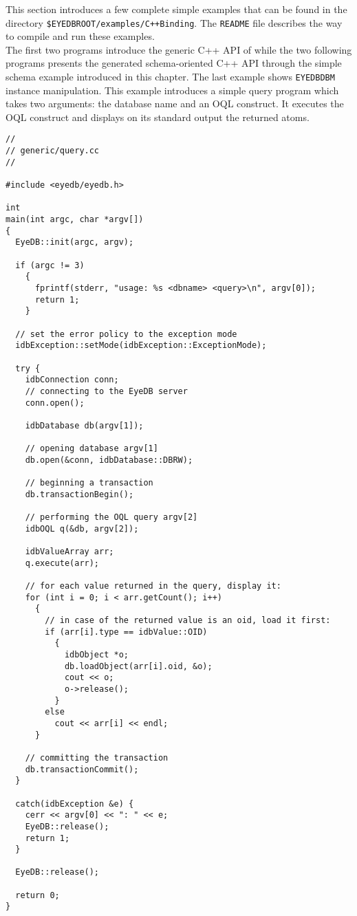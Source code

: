 This section introduces a few complete simple examples that can be found
in the directory
\texttt{\$EYEDBROOT/examples/C++Binding}.
The \texttt{README} file describes the way to compile and run these examples.
\\
The first two programs introduce the generic C++ API of
\eyedb while the two following programs presents the
generated schema-oriented C++ API through the simple schema example introduced
in this chapter. The last example shows \texttt{EYEDBDBM} instance
manipulation.
This example introduces a simple query program which takes
two arguments: the database name and an OQL construct. It executes
the OQL construct and displays on its standard output the returned
atoms.
\verbsize
\begin{verbatim}
//
// generic/query.cc
//

#include <eyedb/eyedb.h>

int
main(int argc, char *argv[])
{
  EyeDB::init(argc, argv);

  if (argc != 3)
    {
      fprintf(stderr, "usage: %
      return 1;
    }

  // set the error policy to the exception mode
  idbException::setMode(idbException::ExceptionMode);

  try {
    idbConnection conn;
    // connecting to the EyeDB server
    conn.open();

    idbDatabase db(argv[1]);

    // opening database argv[1]
    db.open(&conn, idbDatabase::DBRW);

    // beginning a transaction
    db.transactionBegin();

    // performing the OQL query argv[2]
    idbOQL q(&db, argv[2]);

    idbValueArray arr;
    q.execute(arr);

    // for each value returned in the query, display it:
    for (int i = 0; i < arr.getCount(); i++)
      {
        // in case of the returned value is an oid, load it first:
        if (arr[i].type == idbValue::OID)
          {
            idbObject *o;
            db.loadObject(arr[i].oid, &o);
            cout << o;
            o->release();
          }
        else
          cout << arr[i] << endl;
      }

    // committing the transaction
    db.transactionCommit();
  }

  catch(idbException &e) {
    cerr << argv[0] << ": " << e;
    EyeDB::release();
    return 1;
  }

  EyeDB::release();

  return 0;
}
\end{verbatim}
